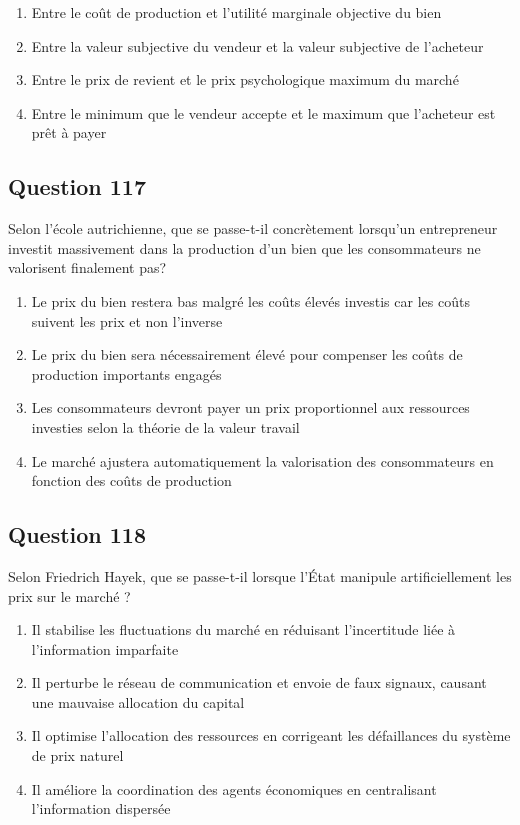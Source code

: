 \documentclass[12pt,a4paper]{article}
\begin{document}
\begin{enumerate}[label=\Alph*., leftmargin=*]
\item Entre le coût de production et l'utilité marginale objective du bien
\item Entre la valeur subjective du vendeur et la valeur subjective de l'acheteur
\item Entre le prix de revient et le prix psychologique maximum du marché
\item Entre le minimum que le vendeur accepte et le maximum que l'acheteur est prêt à payer
\end{enumerate}

\bigskip


\subsection*{Question 117}
Selon l'école autrichienne, que se passe-t-il concrètement lorsqu'un entrepreneur investit massivement dans la production d'un bien que les consommateurs ne valorisent finalement pas?

\begin{enumerate}[label=\Alph*., leftmargin=*]
\item Le prix du bien restera bas malgré les coûts élevés investis car les coûts suivent les prix et non l'inverse
\item Le prix du bien sera nécessairement élevé pour compenser les coûts de production importants engagés
\item Les consommateurs devront payer un prix proportionnel aux ressources investies selon la théorie de la valeur travail
\item Le marché ajustera automatiquement la valorisation des consommateurs en fonction des coûts de production
\end{enumerate}

\bigskip


\subsection*{Question 118}
Selon Friedrich Hayek, que se passe-t-il lorsque l'État manipule artificiellement les prix sur le marché ?

\begin{enumerate}[label=\Alph*., leftmargin=*]
\item Il stabilise les fluctuations du marché en réduisant l'incertitude liée à l'information imparfaite
\item Il perturbe le réseau de communication et envoie de faux signaux, causant une mauvaise allocation du capital
\item Il optimise l'allocation des ressources en corrigeant les défaillances du système de prix naturel
\item Il améliore la coordination des agents économiques en centralisant l'information dispersée
\end{enumerate}
\end{document}
